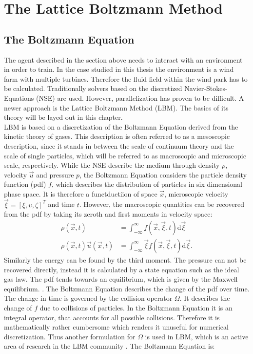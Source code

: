 \section{The Lattice Boltzmann Method}
\label{sec:LBM}
\subsection{The Boltzmann Equation}
The agent described in the section above needs to interact with an environment in order to train. In the case studied in this thesis the environment is a wind farm with multiple turbines. Therefore the fluid field within the wind park has to be calculated. 
Traditionally solvers based on the discretized Navier-Stokes-Equations (NSE) are used. However, parallelization has proven to be difficult. A newer approach is the Lattice Boltzmann Method (LBM). The basics of its theory will be layed out in this chapter. \\ 
LBM is based on a discretization of the Boltzmann Equation derived from the kinetic theory of gases. This description is often referred to as a mesoscopic description, since it stands in  between the scale of continuum theory and the scale of single particles, which will be referred to as macroscopic and microscopic scale, respectively. While the NSE describe the medium through density $\rho$, velocity $\vec{u}$ and pressure $p$, the Boltzmann Equation considers the particle density function (pdf) $f$, which describes the distribution of particles in six dimensional phase space. It is therefore a functductiion of space $\vec{x}$, microscopic velocity $\vec{\xi} = [\xi, \upsilon, \zeta]^T$ and time $t$. However, the macroscopic quantities can be recovered from the pdf by taking its zeroth and first moments in velocity space:
\begin{align}
	\rho(\vec{x}, t) &= \int_{-\infty}^{\infty} f(\vec{x}, \vec{\xi}, t) \mathrm{d}\vec{\xi} \label{eq:rho} \\
	\rho(\vec{x}, t) \vec{u}(\vec{x}, t) &= \int_{-\infty}^{\infty} \vec{\xi} f(\vec{x}, \vec{\xi}, t) \mathrm{d}\vec{\xi}. \label{eq:velocity}
\end{align}
Similarly the energy can be found by the third moment. The pressure can not be recovered directly, instead it is calculated by a state equation such as the ideal gas law. The pdf tends towards an equilibrium, which is given by the Maxwell equilibrium. . 
The Boltzmann Equation describes the change of the pdf over time. The change in time is governed by the collision operator $\Omega$. It describes the change of $f$ due to collisions of particles. In the Boltzmann Equation it is an integral operator, that accounts for all possible collisions. Therefore it is mathematically rather cumbersome which renders it unuseful for numerical discretization. Thus another formulation for $\Omega$ is used in LBM, which is an active area of research in the LBM community \cite{coreixas_comprehensive_2019}. The Boltzmann Equation is:
